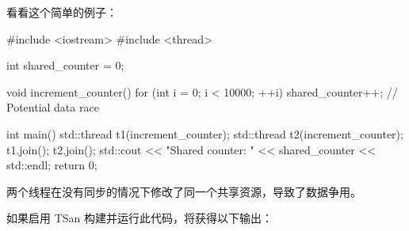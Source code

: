 
看看这个简单的例子：

\begin{cpp}
#include <iostream>
#include <thread>

int shared_counter = 0;

void increment_counter() {
    for (int i = 0; i < 10000; ++i) {
        shared_counter++; // Potential data race
    }
}

int main() {
    std::thread t1(increment_counter);
    std::thread t2(increment_counter);
    t1.join();
    t2.join();
    std::cout << "Shared counter: " << shared_counter << std::endl;
    return 0;
}
\end{cpp}

两个线程在没有同步的情况下修改了同一个共享资源，导致了数据争用。

如果启用 TSan 构建并运行此代码，将获得以下输出：

